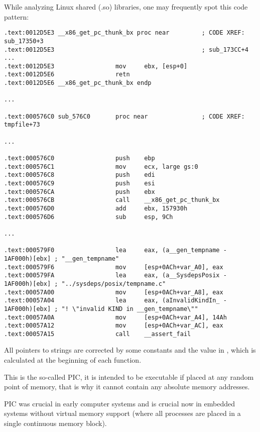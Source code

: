 \sectionold{\CapitalPICcode}
\myindex{\PICcode}
\label{sec:PIC}

While analyzing Linux shared (.so) libraries, one may frequently spot this code pattern:

\begin{lstlisting}[caption=libc-2.17.so x86]
.text:0012D5E3 __x86_get_pc_thunk_bx proc near         ; CODE XREF: sub_17350+3
.text:0012D5E3                                         ; sub_173CC+4 ...
.text:0012D5E3                 mov     ebx, [esp+0]
.text:0012D5E6                 retn
.text:0012D5E6 __x86_get_pc_thunk_bx endp

...

.text:000576C0 sub_576C0       proc near               ; CODE XREF: tmpfile+73

...

.text:000576C0                 push    ebp
.text:000576C1                 mov     ecx, large gs:0
.text:000576C8                 push    edi
.text:000576C9                 push    esi
.text:000576CA                 push    ebx
.text:000576CB                 call    __x86_get_pc_thunk_bx
.text:000576D0                 add     ebx, 157930h
.text:000576D6                 sub     esp, 9Ch

...

.text:000579F0                 lea     eax, (a__gen_tempname - 1AF000h)[ebx] ; "__gen_tempname"
.text:000579F6                 mov     [esp+0ACh+var_A0], eax
.text:000579FA                 lea     eax, (a__SysdepsPosix - 1AF000h)[ebx] ; "../sysdeps/posix/tempname.c"
.text:00057A00                 mov     [esp+0ACh+var_A8], eax
.text:00057A04                 lea     eax, (aInvalidKindIn_ - 1AF000h)[ebx] ; "! \"invalid KIND in __gen_tempname\""
.text:00057A0A                 mov     [esp+0ACh+var_A4], 14Ah
.text:00057A12                 mov     [esp+0ACh+var_AC], eax
.text:00057A15                 call    __assert_fail
\end{lstlisting}


All pointers to strings are corrected by some constants and the value in \EBX,
which is calculated at the beginning of each function.

This is the so-called \ac{PIC}, it is intended to be executable if placed at any random point of memory, that is why it cannot contain any absolute memory addresses.

\ac{PIC} was crucial in early computer systems and is crucial now in embedded systems without 
virtual memory support (where all processes are placed in a single continuous memory block).

